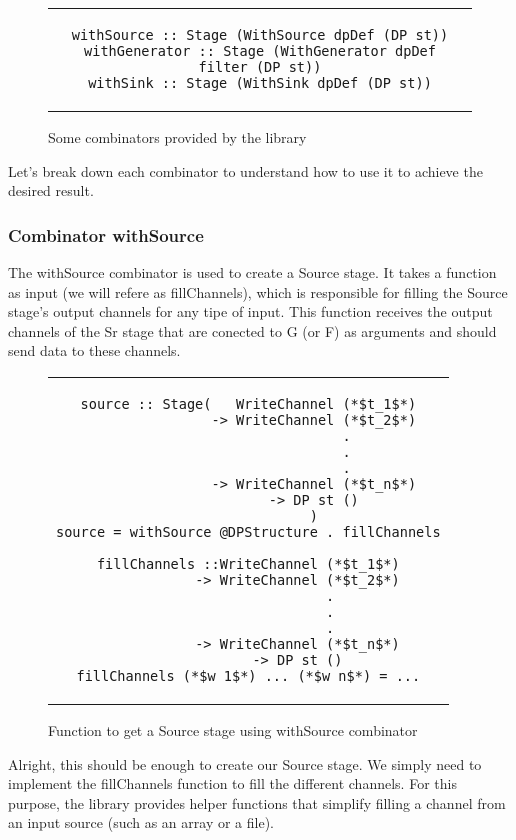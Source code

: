 \begin{figure}[H]
    \begin{tabular}{c}
        \begin{lstlisting}
withSource :: Stage (WithSource dpDef (DP st))
withGenerator :: Stage (WithGenerator dpDef filter (DP st))
withSink :: Stage (WithSink dpDef (DP st))
        \end{lstlisting}
    \end{tabular}
    \caption[{[Code]}Library combinators]{Some combinators provided by the library}
    \label{fig:HC2}
\end{figure}
Let's break down each combinator to understand how to use it to achieve the desired result.

\subsubsection*{Combinator withSource}

The withSource combinator is used to create a Source stage.
It takes a function as input (we will refere as fillChannels), which is responsible for filling the Source stage's output channels for any tipe of input.
This function receives the output channels of the Sr stage that are conected to G (or F) as arguments and should send data to these channels.

\begin{figure}[H]
    \begin{tabular}{c}
        \begin{lstlisting}
source :: Stage(   WriteChannel (*$t_1$*)
                -> WriteChannel (*$t_2$*)
                        .
                        .
                        .
                -> WriteChannel (*$t_n$*)
                -> DP st ()
                )
source = withSource @DPStructure . fillChannels

fillChannels ::WriteChannel (*$t_1$*)
            -> WriteChannel (*$t_2$*)
                    .
                    .
                    .
            -> WriteChannel (*$t_n$*)
            -> DP st ()
fillChannels (*$w_1$*) ... (*$w_n$*) = ...
        \end{lstlisting}
    \end{tabular}
    \caption[{[Code]}withSource combinator]{Function to get a Source stage using withSource combinator}
    \label{fig:HC3}
\end{figure}

Alright, this should be enough to create our Source stage.
We simply need to implement the fillChannels function to fill the different channels.
For this purpose, the library provides helper functions that simplify filling a channel from an input source (such as an array or a file).

